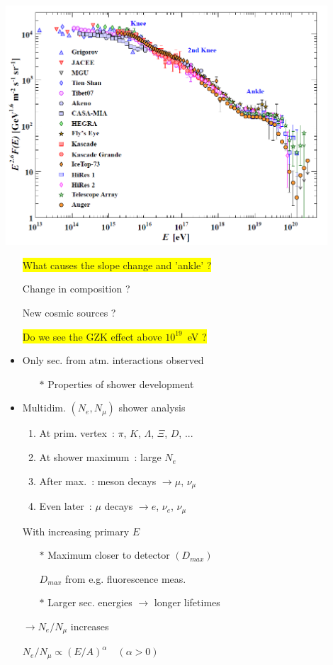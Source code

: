 \newpage
%
\includegraphics[keepaspectratio,width=12cm]{cr-all-scaled26}
%
\begin{itemize}
\item[] \colorbox{yellow}{What causes the slope change and 'ankle' ?}
\item[] Change in composition ?
\item[] New cosmic sources ?
\item[] \colorbox{yellow}{Do we see the GZK effect above $10^{19}$~eV ?}
\end{itemize}

\Tr
{}%
\begin{itemize}
\item Only sec. from atm. interactions observed
\begin{itemize}
\item[$\ast$] Properties of shower development
\end{itemize}
\item Multidim. $(N_{e},N_{\mu})$ shower analysis
\begin{enumerate}
\item At prim. vertex~: $\pi$, $K$, $\Lambda$, $\Xi$, $D$, ...
\item At shower maximum~: large $N_{e}$
\item After max.~: meson decays $\rightarrow \mu$, $\nu_{\mu}$
\item Even later~: $\mu$ decays $\rightarrow e$, $\nu_{e}$, $\nu_{\mu}$
\end{enumerate}
\item[] {\blue With increasing primary $E$}
\begin{itemize}
\item[$\ast$] Maximum closer to detector $(D_{max})$
\item[] $D_{max}$ from e.g. fluorescence meas.
\item[$\ast$] Larger sec. energies $\rightarrow$ longer lifetimes
\end{itemize}
\item[] {\blue $\rightarrow N_{e}/N_{\mu}$ increases}
\item[] $N_{e}/N_{\mu} \propto (E/A)^{\alpha} \quad (\alpha > 0)$
\end{itemize}

